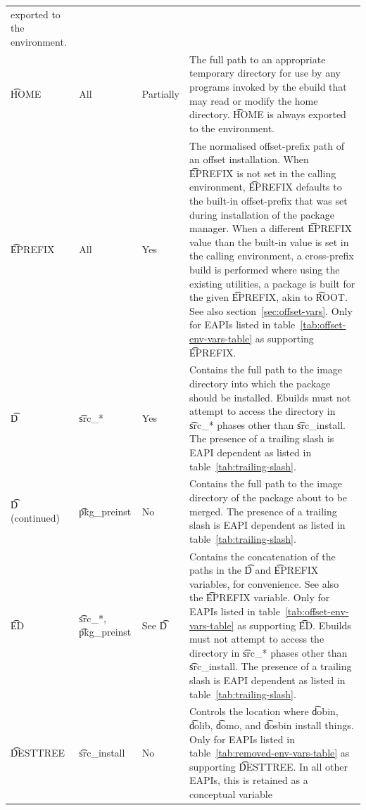\begin{landscape}
\begin{longtable}{l P{7em} l p{\mycolwidth}}
    exported to the environment. \\
\t{HOME} &
    All &
    Partially &
    The full path to an appropriate temporary directory for use by any programs invoked by the
    ebuild that may read or modify the home directory. \t{HOME} is always exported to the
    environment. \\
\t{EPREFIX} &
    All &
    Yes &
    The normalised offset-prefix path of an offset installation.  When \t{EPREFIX} is not set in the
    calling environment, \t{EPREFIX} defaults to the built-in offset-prefix that was set during
    installation of the package manager. When a different \t{EPREFIX} value than the built-in value
    is set in the calling environment, a cross-prefix build is performed where using the existing
    utilities, a package is built for the given \t{EPREFIX}, akin to \t{ROOT}\@. See also
    section~\ref{sec:offset-vars}. Only for EAPIs listed in table~\ref{tab:offset-env-vars-table}
    as supporting \t{EPREFIX}. \\
\t{D} &
    \t{src_*} &
    Yes &
    Contains the full path to the image directory into which the package should be installed.
    Ebuilds must not attempt to access the directory in \t{src_*} phases other than \t{src_install}.
    The presence of a trailing slash is EAPI dependent as listed in table~\ref{tab:trailing-slash}.
    \\
\t{D} (continued) &
    \t{pkg_preinst} &
    No &
    Contains the full path to the image directory of the package about to be merged.
    The presence of a trailing slash is EAPI dependent as listed in table~\ref{tab:trailing-slash}.
    \\
\t{ED} &
    \t{src_*}, \t{pkg_preinst} &
    See \t{D} &
    Contains the concatenation of the paths in the \t{D} and \t{EPREFIX} variables,
    for convenience. See also the \t{EPREFIX} variable. Only for EAPIs listed in
    table~\ref{tab:offset-env-vars-table} as supporting \t{ED}\@. Ebuilds must not attempt to
    access the directory in \t{src_*} phases other than \t{src_install}. The presence of a trailing
    slash is EAPI dependent as listed in table~\ref{tab:trailing-slash}. \\
\t{DESTTREE} &
    \t{src_install} &
    No &
     Controls the location where \t{dobin}, \t{dolib}, \t{domo},
    and \t{dosbin} install things. Only for EAPIs listed in table~\ref{tab:removed-env-vars-table}
    as supporting \t{DESTTREE}\@. In all other EAPIs, this is retained as a conceptual variable

\end{longtable}
\end{landscape}
